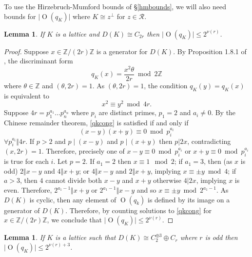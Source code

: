 \documentclass[12pt, a4paper]{article}
\newtheorem{lemma}[thm]{Lemma}
\newcommand{\ZZ}{\mathbb{Z}}
\newcommand{\rc}{\mathcal{R}}
\newcommand{\opn}{\operatorname}
\newcommand{\op}{\oplus}
\begin{document}
To use the Hirzebruch-Mumford bounds of \S\ref{hmbounds}, we will also need bounds for $\vert \opn{O}(q_K) \vert$ where $K \cong z^{\perp}$ for $z \in \rc$.
\begin{lemma}\label{OqkLemma}
  If $K$ is a lattice and $D(K) \cong C_{2r}$ then
  $\vert \opn{O}(q_K) \vert \leq 2^{\nu(r)}$. 
\end{lemma}
\begin{proof}
  Suppose $x \in \ZZ/(2r) \ZZ$ is a generator for $D(K)$. 
  By Proposition 1.8.1 of \cite{Nikulin}, the discriminant form 
  \begin{equation*}
    q_K(x)=    \frac{x^2 \theta}{2r} \bmod{2 \ZZ}
  \end{equation*}
  where $\theta \in \ZZ$ and $(\theta, 2r)=1$. 
As $(\theta, 2r)=1$, the condition $q_K(y) = q_K(x)$ is equivalent to
  \begin{equation}\label{qkcong}
    x^2 \equiv y^2  \bmod{4r}.
  \end{equation}
Suppose $4r = p_1^{a_1} \ldots p_n^{a_n}$ where $p_i$ are distinct primes, $p_1 = 2$ and $a_i \neq 0$.
  By the Chinese remainder theorem, \eqref{qkcong} is satisfied if and only if
\[ 
  (x-y)(x+y) \equiv 0 \bmod{p_i^{a_i}} 
  \] 
$\forall p_i^{a_i} \Vert 4r$.
  If $p>2$ and $p \mid (x-y)$ and $p \mid (x+y)$ then $p \vert 2x$, contradicting $(x, 2r) = 1$.
  Therefore, precisely one of $x-y \equiv 0 \bmod{ p_i^{a_i}}$ or $x+y \equiv 0 \bmod{p_i^{a_i}}$ is true for each $i$.
  Let $p=2$.
  If $a_1=2$ then $x \equiv 1 \mod{2}$;
  if $a_1=3$, then (as $x$ is odd) $2 \Vert x-y$ and $4 \Vert x+y$; or $4 \Vert x-y$ and $2 \Vert x+y$,
  implying $x \equiv \pm y \bmod{ 4}$;
  if $a>3$, then $4$ cannot divide both $x-y$ and $x+y$ otherwise $4 \vert 2x$, implying  $x$ is even.
  Therefore, $2^{a_1 - 1} \Vert x+y$ or $2^{a_1 - 1} \Vert x-y$ and so $x \equiv \pm y \bmod{2^{a_1 - 1}}$. 
  As $D(K)$ is cyclic, then any element of $\opn{O}(q_k)$ is defined by its image on a generator of $D(K)$.
  Therefore, by counting solutions to \eqref{qkcong} for $x \in \ZZ / (2r) \ZZ$, we conclude that $\vert \opn{O}(q_K) \vert \leq 2^{\nu(r)}$.
\end{proof}
\begin{lemma}\label{c2c2c2crLemma}
  If $K$ is a lattice such that $D(K) \cong C_2^{\op 3} \op C_r$ where $r$ is odd then $\vert \opn{O}(q_K) \vert \leq 2^{\nu(r) + 3}$.
\end{lemma}
\end{document}
